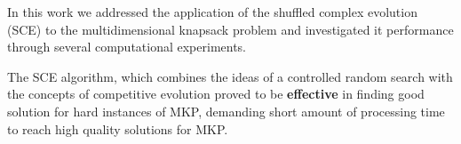 In this work we addressed the application of the shuffled complex
evolution (SCE) to the multidimensional knapsack problem and investigated it
performance through several computational experiments.

The SCE algorithm, which combines the ideas of a controlled random search with
the concepts of competitive evolution proved to be {\bf effective} in finding
good solution for hard instances of MKP, demanding short amount of
processing time to reach high quality solutions for MKP.

